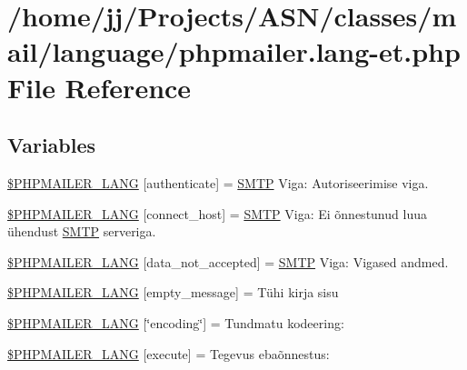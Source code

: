 \hypertarget{phpmailer_8lang-et_8php}{}\section{/home/jj/\+Projects/\+A\+S\+N/classes/mail/language/phpmailer.lang-\/et.php File Reference}
\label{phpmailer_8lang-et_8php}
\subsection*{Variables}
\begin{DoxyCompactItemize}
\item 
\hyperlink{phpmailer_8lang-et_8php_a2cb33073c989b85580748e331ed8b4aa}{\$\+P\+H\+P\+M\+A\+I\+L\+E\+R\+\_\+\+L\+A\+NG} \mbox{[}\textquotesingle{}authenticate\textquotesingle{}\mbox{]} = \textquotesingle{}\hyperlink{class_s_m_t_p}{S\+M\+TP} Viga\+: Autoriseerimise viga.\textquotesingle{}
\item 
\hyperlink{phpmailer_8lang-et_8php_a2ee0cc637a06b96e45600db31c6799ee}{\$\+P\+H\+P\+M\+A\+I\+L\+E\+R\+\_\+\+L\+A\+NG} \mbox{[}\textquotesingle{}connect\+\_\+host\textquotesingle{}\mbox{]} = \textquotesingle{}\hyperlink{class_s_m_t_p}{S\+M\+TP} Viga\+: Ei õnnestunud luua ühendust \hyperlink{class_s_m_t_p}{S\+M\+TP} serveriga.\textquotesingle{}
\item 
\hyperlink{phpmailer_8lang-et_8php_a814c6b191205d2361b3233e9c9d6fda5}{\$\+P\+H\+P\+M\+A\+I\+L\+E\+R\+\_\+\+L\+A\+NG} \mbox{[}\textquotesingle{}data\+\_\+not\+\_\+accepted\textquotesingle{}\mbox{]} = \textquotesingle{}\hyperlink{class_s_m_t_p}{S\+M\+TP} Viga\+: Vigased andmed.\textquotesingle{}
\item 
\hyperlink{phpmailer_8lang-et_8php_a33772099f637c9d6c2cd7425e0e37fed}{\$\+P\+H\+P\+M\+A\+I\+L\+E\+R\+\_\+\+L\+A\+NG} \mbox{[}\textquotesingle{}empty\+\_\+message\textquotesingle{}\mbox{]} = \textquotesingle{}Tühi kirja sisu\textquotesingle{}
\item 
\hyperlink{phpmailer_8lang-et_8php_a91dcbbc49ce0c4ca35a4d547ca347c21}{\$\+P\+H\+P\+M\+A\+I\+L\+E\+R\+\_\+\+L\+A\+NG} \mbox{[}\char`\"{}encoding\char`\"{}\mbox{]} = \textquotesingle{}Tundmatu kodeering\+: \textquotesingle{}
\item 
\hyperlink{phpmailer_8lang-et_8php_a668217a9563a168f30f2a8548b6ed5a9}{\$\+P\+H\+P\+M\+A\+I\+L\+E\+R\+\_\+\+L\+A\+NG} \mbox{[}\textquotesingle{}execute\textquotesingle{}\mbox{]} = \textquotesingle{}Tegevus ebaõnnestus\+: \textquotesingle{}

\end{DoxyCompactItemize}
